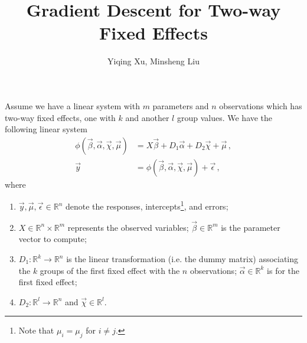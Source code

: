 \documentclass{tufte-handout}
\newenvironment{inlinenum}
    {\begin{enumerate}
      [ itemsep    = -1mm
      , topsep     = -1mm
      , leftmargin = .5in
      ]}
    {\vskip 1mm\end{enumerate}}
\begin{document}
  \title{Gradient Descent for Two-way Fixed Effects}
  \author{Yiqing Xu, Minsheng Liu}
  \maketitle

  Assume we have a linear system with $m$ parameters and $n$ observations which
  has two-way fixed effects, one with $k$ and another $l$ group values.
  We have the following linear system
  \begin{align*}
    \phi(\vec{\beta}, \vec{\alpha}, \vec{\chi}, \vec{\mu})
    &= X\vec{\beta} + D_1\vec{\alpha} + D_2\vec{\chi} + \vec{\mu} \, , \\
    \vec{y}
    &= \phi(\vec{\beta}, \vec{\alpha}, \vec{\chi}, \vec{\mu}) + \vec{\epsilon} \, ,
  \end{align*}
  where
  \begin{inlinenum}
    \item $\vec{y}, \vec{\mu}, \vec{\epsilon} \in \mathbb{R}^n$ denote
      the responses, intercepts\footnote{Note that $\mu_i = \mu_j$ for $i \neq j$.},
      and errors;
    \item $X \in \mathbb{R}^n \times \mathbb{R}^m$ represents the observed variables;
      $\vec{\beta} \in \mathbb{R}^m$ is the parameter vector to compute;
    \item $D_1: \mathbb{R}^k \to \mathbb{R}^n$ is the linear transformation%
      (i.e. the dummy matrix) associating the $k$ groups of the first fixed
      effect with the $n$ observations; $\vec{\alpha} \in \mathbb{R}^k$ is
      for the first fixed effect;
    \item $D_2: \mathbb{R}^l \to \mathbb{R}^n$ and $\vec{\chi} \in \mathbb{R}^l$.
  \end{inlinenum}
  
\end{document}
